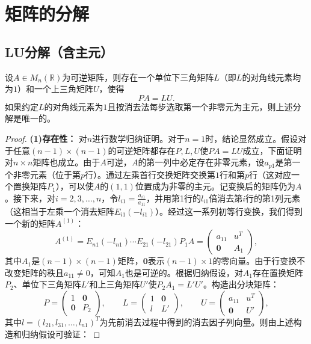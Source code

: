 \section{矩阵的分解}

\subsection{LU分解（含主元）}
\begin{theorem}\label{theo:LU}
	设$A\in M_{n}(\mathbb{R})$为可逆矩阵，则存在一个单位下三角矩阵$L$（即$L$的对角线元素均为$1$）和一个上三角矩阵$U$，使得
	\[PA = LU.\] 
	如果约定$L$的对角线元素为$1$且按消去法每步选取第一个非零元为主元，则上述分解是唯一的。
\end{theorem}
\begin{proof}
	\textbf{(1)存在性：} 对$n$进行数学归纳证明。对于$n=1$时，结论显然成立。假设对于任意$(n-1)\times(n-1)$的可逆矩阵都存在$P,L,U$使$P A = L U$成立，下面证明对$n\times n$矩阵也成立。由于$A$可逆，$A$的第一列中必定存在非零元素，设$a_{p1}$是第一个非零元素（位于第$p$行）。通过左乘首行交换矩阵交换第$1$行和第$p$行（这对应一个置换矩阵$P_1$），可以使$A$的$(1,1)$位置成为非零的主元。记变换后的矩阵仍为$A$。接下来，对$i=2,3,\dots,n$，令$l_{i1}=\frac{a_{i1}}{a_{11}}$，并用第1行的$l_{i1}$倍消去第$i$行的第1列元素（这相当于左乘一个消去矩阵$E_{i1}(-l_{i1})$）。经过这一系列初等行变换，我们得到一个新的矩阵$A^{(1)}$：
	\[ A^{(1)} = E_{n1}(-l_{n1}) \cdots E_{21}(-l_{21}) P_1 A = 
	\begin{pmatrix}
		a_{11} & u^T \\
		\mathbf{0} & A_1
	\end{pmatrix}, \] 
	其中$A_1$是$(n-1)\times(n-1)$矩阵，$\mathbf{0}$表示$(n-1)\times 1$的零向量。由于行变换不改变矩阵的秩且$a_{11}\neq0$，可知$A_1$也是可逆的。根据归纳假设，对$A_1$存在置换矩阵$P_2$、单位下三角矩阵$L'$和上三角矩阵$U'$使$P_2 A_1 = L' U'$。构造出分块矩阵：
	\[ 
	P = \begin{pmatrix}
		1 & \mathbf{0} \\
		\mathbf{0} & P_2
	\end{pmatrix}, \qquad 
	L = \begin{pmatrix}
		1 & \mathbf{0} \\
		l & L'
	\end{pmatrix}, \qquad 
	U = \begin{pmatrix}
		a_{11} & u^T \\
		\mathbf{0} & U'
	\end{pmatrix},
	\] 
	其中$l=(l_{21},l_{31},\dots,l_{n1})^T$为先前消去过程中得到的消去因子列向量。则由上述构造和归纳假设可验证：

\end{proof}
